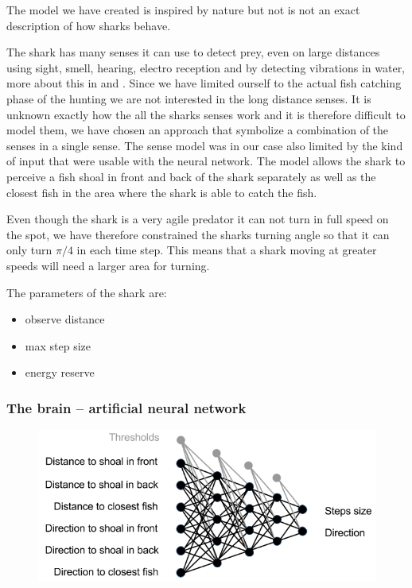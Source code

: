 The model we have created is inspired by nature but not is not an exact description of how sharks behave.

The shark has many senses it can use to detect prey, even on large distances using sight, smell, hearing, electro reception and by detecting vibrations in water, more about this in \cite{shark_vision} and \cite{shark_electric}. Since we have limited ourself to the actual fish catching phase of the hunting we are not interested in the long distance senses.  It is unknown exactly how the all the sharks senses work and it is therefore  difficult to model them, we have chosen an approach that symbolize a combination of the senses in a single sense. The sense model was in our case also limited by the kind of input that were usable with the neural network. The model allows the shark to perceive a fish shoal in front and back of the shark separately as well as the closest fish in the area where the shark is able to catch the fish.

Even though the shark is a very agile predator it can not turn in full speed on the spot, we have therefore constrained the sharks turning angle so that it can only turn $\pi/4$ in each time step. This means that a shark moving at greater speeds will need a larger area for turning.

The parameters of the shark are:
\begin{itemize}
\item observe distance
\item max step size
\item energy reserve
\end{itemize}

\subsubsection{The brain -- artificial neural network}
\begin{figure}
\centering
\includegraphics[width=.7\textwidth]{figs/ann_structure.png}
\caption{\label{fig:ann}}
\end{figure}

